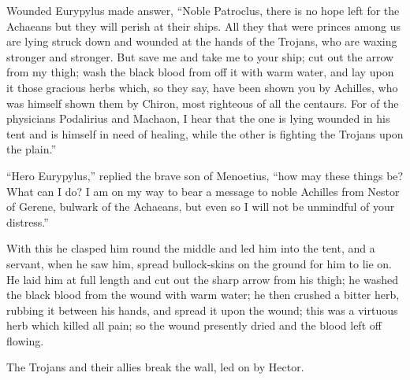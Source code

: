Wounded Eurypylus made answer, “Noble Patroclus, there is no hope left for
the Achaeans but they will perish at their ships. All they that were
princes among us are lying struck down and wounded at the hands of the
Trojans, who are waxing stronger and stronger. But save me and take me to
your ship; cut out the arrow from my thigh; wash the black blood from off
it with warm water, and lay upon it those gracious herbs which, so they
say, have been shown you by Achilles, who was himself shown them by
Chiron, most righteous of all the centaurs. For of the physicians
Podalirius and Machaon, I hear that the one is lying wounded in his tent
and is himself in need of healing, while the other is fighting the Trojans
upon the plain.”

“Hero Eurypylus,” replied the brave son of Menoetius, “how may these
things be? What can I do? I am on my way to bear a message to noble
Achilles from Nestor of Gerene, bulwark of the Achaeans, but even so I
will not be unmindful of your distress.”

With this he clasped him round the middle and led him into the tent, and a
servant, when he saw him, spread bullock-skins on the ground for him to
lie on. He laid him at full length and cut out the sharp arrow from his
thigh; he washed the black blood from the wound with warm water; he then
crushed a bitter herb, rubbing it between his hands, and spread it upon
the wound; this was a virtuous herb which killed all pain; so the wound
presently dried and the blood left off flowing.


The Trojans and their allies break the wall, led on by Hector.


